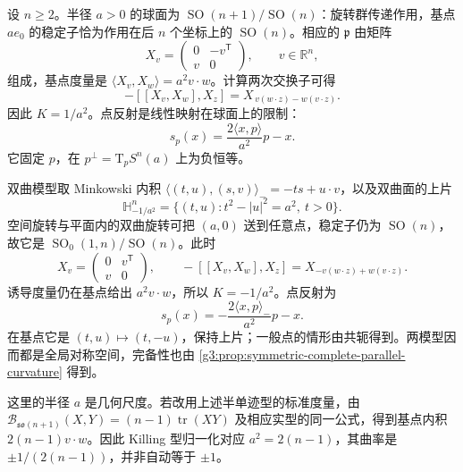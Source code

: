 \begin{example}\label{g3:ex:sphere-hyperbolic-symmetric-models}
	设 \(n\ge2\)。半径 \(a>0\) 的球面为 \(\operatorname{SO}(n+1)/\operatorname{SO}(n)\)：旋转群传递作用，基点 \(ae_0\) 的稳定子恰为作用在后 \(n\) 个坐标上的 \(\operatorname{SO}(n)\)。相应的 \(\mathfrak p\) 由矩阵
	\[
		X_v=\begin{pmatrix}0&-v^{\mathsf T}\\v&0\end{pmatrix},\qquad v\in\mathbb R^n,
	\]
	组成，基点度量是 \(\langle X_v,X_w\rangle=a^2v\cdot w\)。计算两次交换子可得
	\[
		-[[X_v,X_w],X_z]
		=X_{\,v(w\cdot z)-w(v\cdot z)}.
	\]
	因此 \(K=1/a^2\)。点反射是线性映射在球面上的限制：
	\[
		s_p(x)=\frac{2\langle x,p\rangle}{a^2}p-x.
	\]
	它固定 \(p\)，在 \(p^\perp=\mathrm T_pS^n(a)\) 上为负恒等。

	双曲模型取 Minkowski 内积 \(\langle(t,u),(s,v)\rangle_-=-ts+u\cdot v\)，以及双曲面的上片
	\[
		\mathbb H^n_{-1/a^2}
		=\{(t,u):t^2-|u|^2=a^2,\ t>0\}.
	\]
	空间旋转与平面内的双曲旋转可把 \((a,0)\) 送到任意点，稳定子仍为 \(\operatorname{SO}(n)\)，故它是 \(\operatorname{SO}_0(1,n)/\operatorname{SO}(n)\)。此时
	\[
		X_v=\begin{pmatrix}0&v^{\mathsf T}\\v&0\end{pmatrix},\qquad
		-[[X_v,X_w],X_z]=X_{-v(w\cdot z)+w(v\cdot z)}.
	\]
	诱导度量仍在基点给出 \(a^2v\cdot w\)，所以 \(K=-1/a^2\)。点反射为
	\[
		s_p(x)=-\frac{2\langle x,p\rangle_-}{a^2}p-x.
	\]
	在基点它是 \((t,u)\mapsto(t,-u)\)，保持上片；一般点的情形由共轭得到。两模型因而都是全局对称空间，完备性也由 \cref{g3:prop:symmetric-complete-parallel-curvature} 得到。

	这里的半径 \(a\) 是几何尺度。若改用上述半单迹型的标准度量，由 \(\mathcal B_{\mathfrak{so}(n+1)}(X,Y)=(n-1)\operatorname{tr}(XY)\) 及相应实型的同一公式，得到基点内积 \(2(n-1)v\cdot w\)。因此 Killing 型归一化对应 \(a^2=2(n-1)\)，其曲率是 \(\pm1/(2(n-1))\)，并非自动等于 \(\pm1\)。
\end{example}

